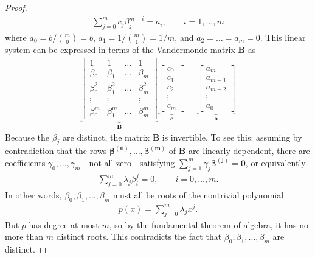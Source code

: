 \documentclass{article}
\def\va{{\bm{a}}}
\def\vc{{\bm{c}}}
\def\mB{{\bm{B}}}
\begin{document}
\begin{appendices}
\begin{proof}
    \begin{align}
        \sum_{j=0}^m c_j \beta_j^{m-i} = a_i, \qquad i = 1, \dots, m
    \end{align}
    where $a_0 = b/{m \choose 0} = b$, $a_1 = 1/{m \choose 1} = 1/m$, and $a_2 = \dots = a_m = 0$. This linear system can be expressed in terms of the Vandermonde matrix $\mB$ as
    \begin{align} \label{eq:vandermonde_matrix_equation}
        \underbrace{\begin{bmatrix}
            1 & 1 & \dots & 1 \\
            \beta_0 & \beta_1 & \dots & \beta_m \\
            \beta_0^2 & \beta_1^2 & \dots & \beta_m^2 \\
            \vdots & \vdots & & \vdots \\
            \beta_0^m & \beta_1^m & \dots & \beta_m^m
        \end{bmatrix}}_{\mB} \underbrace{\begin{bmatrix}
            c_0 \\ c_1 \\ c_2 \\ \vdots \\ c_m
        \end{bmatrix}}_{\vc} = \underbrace{\begin{bmatrix}
            a_m \\ a_{m-1} \\ a_{m-2} \\ \vdots \\ a_0
        \end{bmatrix}}_{\va}
    \end{align}
    Because the $\beta_j$ are distinct, the matrix $\mB$ is invertible. To see this: assuming by contradiction that the rows $\boldsymbol{\beta^{(0)}}, \dots, \boldsymbol{\beta^{(m)}}$ of $\mB$ are linearly dependent, there are coefficients $\gamma_0, \dots, \gamma_m$---not all zero---satisfying $\sum_{j=1}^m \gamma_j \boldsymbol{\beta^{(j)}} = \boldsymbol{0}$, or equivalently
    \begin{align}
        \sum_{j=0}^m \lambda_j \beta_i^j = 0, \qquad i = 0, \dots, m.
    \end{align}
    In other words, $\beta_0, \beta_1, \dots, \beta_m$ must all be roots of the nontrivial polynomial
    \begin{align}
        p(x) = \sum_{j=0}^m \lambda_j x^j.
    \end{align}
    But $p$ has degree at most $m$, so by the fundamental theorem of algebra, it has no more than $m$ distinct roots. This contradicts the fact that $\beta_0, \beta_1, \dots, \beta_m$ are distinct.


\end{proof}
\end{appendices}
\end{document}
